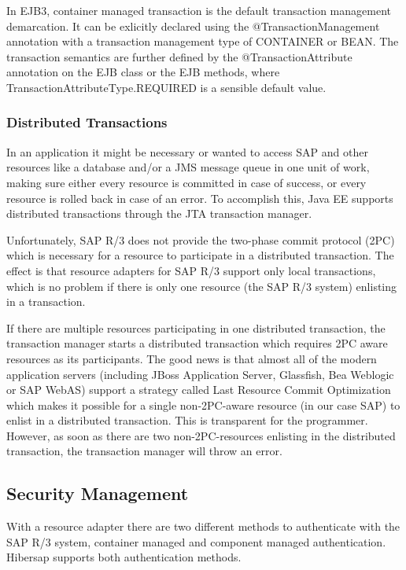 In EJB3, container managed transaction is the default transaction management demarcation. It can be exlicitly declared using the @TransactionManagement annotation with a transaction management type of CONTAINER or BEAN. The transaction semantics are further defined by the @TransactionAttribute annotation on the EJB class or the EJB methods, where TransactionAttributeType.REQUIRED is a sensible default value.

\subsubsection{Distributed Transactions}
In an application it might be necessary or wanted to access SAP and other resources like a database and/or a JMS message queue in one unit of work, making sure either every resource is committed in case of success, or every resource is rolled back in case of an error. To accomplish this, Java EE supports distributed transactions through the JTA transaction manager. 

Unfortunately, SAP R/3 does not provide the two-phase commit protocol (2PC) which is necessary for a resource to participate in a distributed transaction. The effect is that resource adapters for SAP R/3 support only local transactions, which is no problem if there is only one resource (the SAP R/3 system) enlisting in a transaction. 

If there are multiple resources participating in one distributed transaction, the transaction manager starts a distributed transaction which requires 2PC aware resources as its participants. The good news is that almost all of the modern application servers (including JBoss Application Server, Glassfish, Bea Weblogic or SAP WebAS) support a strategy called Last Resource Commit Optimization which makes it possible for a single non-2PC-aware resource (in our case SAP) to enlist in a distributed transaction. This is transparent for the programmer. However, as soon as there are two non-2PC-resources enlisting in the distributed transaction, the transaction manager will throw an error.


\subsection{Security Management}
With a resource adapter there are two different methods to authenticate with the SAP R/3 system, container managed and component managed authentication. Hibersap supports both authentication methods. 

